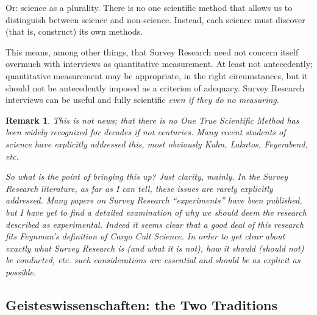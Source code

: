 \documentclass[11pt,twoside]{article}
\newtheorem{remark}{Remark}
\newcommand{\SR}{Survey Research}
\begin{document}
Or: science as a plurality.  There is no one scientific method that
allows us to distinguish between science and non-science.  Instead,
each science must discover (that is, construct) its own methods.

This means, among other things, that \SR{} need not concern itself
overmuch with interviews as quantitative measurement.  At least not
antecedently; quantitative measurement may be appropriate, in the
right circumstances, but it should not be antecedently imposed as a
criterion of adequacy.  \SR{} interviews can be useful and fully
scientific \textit{even if they do no measuring}.

\begin{remark}
  This is not news; that there is no One True Scientific Method has
  been widely recognized for decades if not centuries.  Many recent
  students of science have explicitly addressed this, most obviously
  Kuhn, Lakatos, Feyerabend, etc.

  So what is the point of bringing this up?  Just clarity, mainly.  In
  the \SR{} literature, as far as I can tell, these issues are rarely
  explicitly addressed.  Many papers on \SR{} ``experiments'' have
  been published, but I have yet to find a detailed examination of why
  we should deem the research described as experimental.  Indeed it
  seems clear that a good deal of this research fits Feynman's
  definition of Cargo Cult Science.  In order to get clear about
  exactly what \SR{} is (and what it is not), how it should (should
  not) be conducted, etc. such considerations are essential and should
  be as explicit as possible.
\end{remark}

\parencite{ryan_replication_2011}

\parencite{hurlbert_pseudoreplication_1984}

\subsection{Geisteswissenschaften: the Two Traditions}

\begin{abstract}
  The two traditions are philosophical; what is the relevance to
  science?  If we were talking about \textit{Naturwissenschaften},
  say, physics, the relevance would be minimal.  But that's not the
  case with the human sciences.  One of the problems with them is that
  they have always had trouble disentangling the scientific from the
  philosophical.  So the purpose of this section is to at least sketch
  the main themes that have played important roles in the human
  (social) sciences.  And the reason that is useful is because it
  helps us place Pragmatism in a conceptual space as well as a
  historical context.  Which in turn will help us better to grasp the
  significance of Pragmatism for \SR{}.
\end{abstract}
\end{document}
